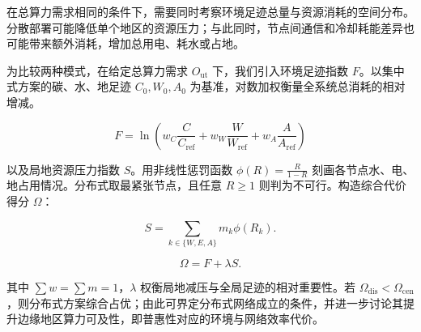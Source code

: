 在总算力需求相同的条件下，需要同时考察环境足迹总量与资源消耗的空间分布。分散部署可能降低单个地区的资源压力；与此同时，节点间通信和冷却耗能差异也可能带来额外消耗，增加总用电、耗水或占地。

为比较两种模式，在给定总算力需求 $O_{\mathrm{ut}}$ 下，我们引入环境足迹指数 $F$。以集中式方案的碳、水、地足迹 $C_0,W_0,A_0$ 为基准，对数加权衡量全系统总消耗的相对增减。

\begin{equation}\label{eq:p-f}
F=\ln (w_C\frac{C}{C_{\mathrm{ref}}}+w_W\frac{W}{W_{\mathrm{ref}}}+w_A\frac{A}{A_{\mathrm{ref}}})
\end{equation}

以及局地资源压力指数 $S$。用非线性惩罚函数 $\phi(R)=\frac{R}{1-R}$ 刻画各节点水、电、地占用情况。分布式取最紧张节点，且任意 $R\geq1$ 则判为不可行。构造综合代价得分 $\Omega$：

\begin{equation}\label{eq:p-s}
S=\sum_{k\in\{W,E,A\}}m_k\phi(R_k).
\end{equation}

\begin{equation}\label{eq:p-omega}
\Omega=F+\lambda S.
\end{equation}

其中 $\sum w=\sum m=1$，$\lambda$ 权衡局地减压与全局足迹的相对重要性。若 $\Omega_{\mathrm{dis}}<\Omega_{\mathrm{cen}}$，则分布式方案综合占优；由此可界定分布式网络成立的条件，并进一步讨论其提升边缘地区算力可及性，即普惠性对应的环境与网络效率代价。
